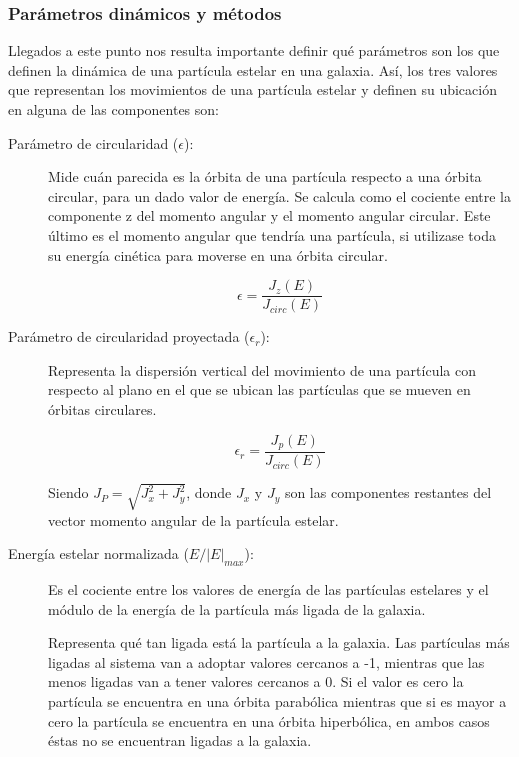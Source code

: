 \subsubsection{Parámetros dinámicos y métodos}

Llegados a este punto  nos resulta importante definir qué parámetros son los que definen la dinámica de una partícula estelar en una galaxia. Así, los tres valores que representan los movimientos de una partícula estelar y definen su ubicación en alguna de las componentes son:

\begin{description}
    \item[Parámetro de circularidad ($\epsilon$):]

    Mide cuán parecida es la órbita de una partícula respecto a una órbita circular, para un dado valor de energía. Se calcula como el cociente entre la componente z del momento angular y el momento angular circular. Este último es el momento angular que tendría una partícula, si utilizase toda su energía cinética para moverse en una órbita circular.
    
\[\epsilon = \frac{J_{z}(E)}{J_{circ}(E)}\]

    \item[Parámetro de circularidad proyectada ($\epsilon_r$):] 

Representa la dispersión vertical del movimiento de una partícula con respecto al plano en el que se ubican las partículas que se mueven en órbitas circulares. 

    \[\epsilon_{r} = \frac{J_{p}(E)}{J_{circ}(E)}\]


Siendo  $J_P = \sqrt{J_x^2 + J_y^2}$, donde $J_x$ y $J_y$ son las componentes restantes del vector momento angular de la partícula estelar.
    
    \item[Energía estelar normalizada ($E/|E|_{max}$):]

    Es el cociente entre los valores de energía de las partículas estelares y el módulo de la energía de la partícula más ligada de la galaxia.

    Representa qué tan ligada está la partícula a la galaxia. Las partículas más ligadas al sistema van a adoptar valores cercanos a -1, mientras que las menos ligadas van a  tener valores cercanos a 0. Si el valor es cero la partícula se encuentra en una órbita parabólica mientras que  si es mayor a cero la partícula se encuentra en una órbita hiperbólica, en ambos casos éstas no se encuentran ligadas a la galaxia.

\end{description}

